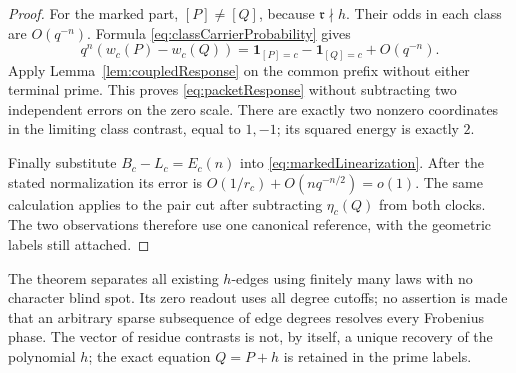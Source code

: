\documentclass[11pt]{article}
\begin{document}
\begin{proof}
For the marked part, \([P]\ne[Q]\), because \(\mathfrak r\nmid h\).
Their odds in each class are \(O(q^{-n})\). Formula
\eqref{eq:classCarrierProbability} gives
\[
 q^n(w_c(P)-w_c(Q))
 =\mathbf1_{[P]=c}-\mathbf1_{[Q]=c}+O(q^{-n}).
\]
Apply Lemma~\ref{lem:coupledResponse} on the common prefix without
either terminal prime. This proves \eqref{eq:packetResponse} without
subtracting two independent errors on the zero scale.
There are exactly two nonzero coordinates in the limiting class
contrast, equal to \(1,-1\); its squared energy is exactly \(2\).

Finally substitute \(B_c-L_c=E_c(n)\) into
\eqref{eq:markedLinearization}. After the stated normalization its
error is \(O(1/r_c)+O(nq^{-n/2})=o(1)\).
The same calculation applies to the pair cut after subtracting
\(\eta_c(Q)\) from both clocks. The two observations therefore use
one canonical reference, with the geometric labels still attached.
\end{proof}

The theorem separates all existing \(h\)-edges using finitely many
laws with no character blind spot. Its zero readout uses all degree
cutoffs; no assertion is made that an arbitrary sparse subsequence of
edge degrees resolves every Frobenius phase. The vector of residue
contrasts is not, by itself, a unique recovery of the polynomial \(h\);
the exact equation \(Q=P+h\) is retained in the prime labels.
\end{document}
